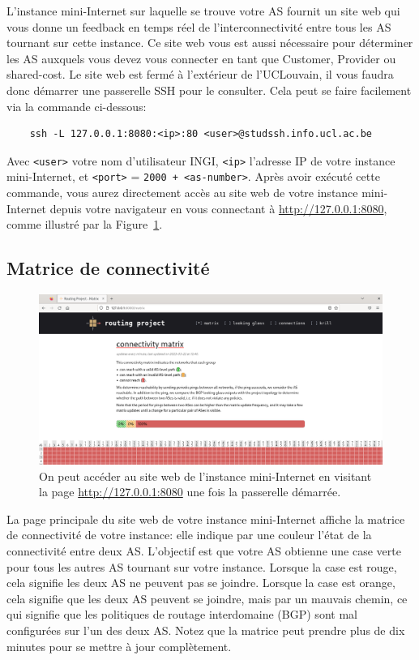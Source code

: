 \documentclass[a4paper, 11pt]{article}
\begin{document}
L'instance mini-Internet sur laquelle se trouve votre AS fournit un site
web qui vous donne un feedback en temps réel de l'interconnectivité
entre tous les AS tournant sur cette instance. Ce site web vous est aussi
nécessaire pour déterminer les AS auxquels vous devez vous connecter
en tant que Customer, Provider ou shared-cost. Le site web est fermé
à l'extérieur de l'UCLouvain, il vous faudra donc démarrer une passerelle
SSH pour le consulter. Cela peut se faire facilement via la commande
ci-dessous:

\begin{verbatim}
    ssh -L 127.0.0.1:8080:<ip>:80 <user>@studssh.info.ucl.ac.be
\end{verbatim}
Avec \texttt{<user>} votre nom d'utilisateur INGI, \texttt{<ip>} l'adresse IP
de votre instance mini-Internet, et \texttt{<port>} = \texttt{2000 + <as-number>}.
Après avoir exécuté cette commande, vous aurez directement accès au site web
de votre instance mini-Internet depuis votre navigateur en vous connectant
à \url{http://127.0.0.1:8080}, comme illustré par la
Figure~\ref{fig:website-screenshot}.

\subsection{Matrice de connectivité}

\begin{figure}
    \centering
    \includegraphics[width=0.8\linewidth]{figures/website-screenshot.png}
    \caption{On peut accéder au site web de l'instance mini-Internet
            en visitant la page \url{http://127.0.0.1:8080}
            une fois la passerelle démarrée.}
    \label{fig:website-screenshot}
\end{figure}

La page principale du site web de votre instance mini-Internet affiche la
matrice de connectivité de votre instance: elle indique par une couleur
l'état de la connectivité entre deux AS. L'objectif est que votre AS
obtienne une case verte pour tous les autres AS tournant sur votre instance.
Lorsque la case est rouge, cela signifie les deux AS ne peuvent pas se joindre.
Lorsque la case est orange, cela signifie que les deux AS peuvent se joindre,
mais par un mauvais chemin, ce qui signifie que les politiques de routage
interdomaine (BGP) sont mal configurées sur l'un des deux AS. Notez que la
matrice peut prendre plus de dix minutes pour se mettre à jour complètement.
\end{document}

